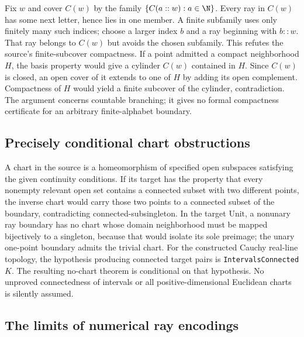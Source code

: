 Fix $w$ and cover $C(w)$ by the family $\{C(a::w):a\in\N\}$. Every ray in $C(w)$ has some next letter, hence lies in one member. A finite subfamily uses only finitely many such indices; choose a larger index $b$ and a ray beginning with $b::w$. That ray belongs to $C(w)$ but avoids the chosen subfamily. This refutes the source's finite-subcover compactness. If a point admitted a compact neighborhood $H$, the basis property would give a cylinder $C(w)$ contained in $H$. Since $C(w)$ is closed, an open cover of it extends to one of $H$ by adding its open complement. Compactness of $H$ would yield a finite subcover of the cylinder, contradiction. The argument concerns countable branching; it gives no formal compactness certificate for an arbitrary finite-alphabet boundary.

\subsection{Precisely conditional chart obstructions}\label{supp:10-7}
\par{}\par\smallskip

A chart in the source is a homeomorphism of specified open subspaces satisfying the given continuity conditions. If its target has the property that every nonempty relevant open set contains a connected subset with two different points, the inverse chart would carry those two points to a connected subset of the boundary, contradicting connected-subsingleton. In the target $\mathrm{Unit}$, a nonunary ray boundary has no chart whose domain neighborhood must be mapped bijectively to a singleton, because that would isolate its sole preimage; the unary one-point boundary admits the trivial chart. For the constructed Cauchy real-line topology, the hypothesis producing connected target pairs is \texttt{IntervalsConnected $K$}. The resulting no-chart theorem is conditional on that hypothesis. No unproved connectedness of intervals or all positive-dimensional Euclidean charts is silently assumed.

\subsection{The limits of numerical ray encodings}\label{supp:10-8}
\par{}\par\smallskip

